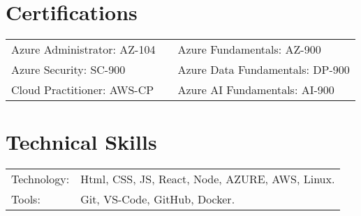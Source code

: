\documentclass[a4paper,12pt]{article}
\begin{document}


\section{Certifications}

\begin{tabularx}{\linewidth}{@{} l X l @{}}
  
    Azure Administrator: AZ-104 & \quad & Azure Fundamentals: AZ-900 \\
    Azure Security: SC-900 & \quad & Azure Data Fundamentals: DP-900 \\
    Cloud Practitioner: AWS-CP  & \quad & Azure AI Fundamentals: AI-900 \\
\end{tabularx}



\section{Technical Skills}
\begin{tabularx}{\linewidth}{@{}l X@{}}
Technology: &  \normalsize{Html, CSS, JS, React, Node, AZURE, AWS, Linux.}\\
\break
\vspace{0.2\baselineskip}
Tools:  &  \normalsize{Git, VS-Code, GitHub, Docker.}\\  
\end{tabularx}

\vfill
{}
\end{document}
